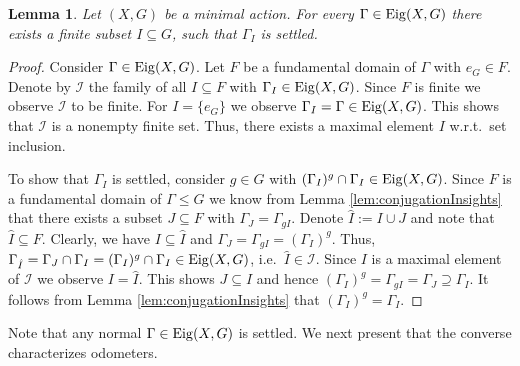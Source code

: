 \documentclass[12pt, reqno]{amsart}
\newtheorem{lemma}[theorem]{Lemma}
\theoremstyle{definition}
\theoremstyle{remark}
\numberwithin{equation}{section}
\theoremstyle{theorem}
\theoremstyle{remark}
\def\Eig{{\rm Eig}}
\begin{document}
\begin{lemma}
\label{lem:creatingEsettledSets}
    Let $(X,G)$ be a minimal action. 
    For every $\Gamma\in \Eig(X,G)$ 
    there exists a finite subset $I\subseteq G$, such that $\Gamma_I$ is settled. 
\end{lemma}
\begin{proof}
    Consider $\Gamma\in \Eig(X,G)$. 
    Let $F$ be a fundamental domain of $\Gamma$ with $e_G\in F$. 
    Denote by $\mathcal{I}$ the family of all $I\subseteq F$ with $\Gamma_I\in \Eig(X,G)$. 
    Since $F$ is finite we observe $\mathcal{I}$ to be finite. 
    For $I=\{e_G\}$ we observe $\Gamma_{I}=\Gamma\in \Eig(X,G)$. 
    This shows that $\mathcal{I}$ is a nonempty finite set. 
    Thus, there exists a maximal element $I$ w.r.t.\ set inclusion. 

    To show that $\Gamma_I$ is settled, consider $g\in G$ with 
    $(\Gamma_I)^g\cap \Gamma_I\in \Eig(X,G)$. 
    Since $F$ is a fundamental domain of $\Gamma\leq G$ we know from Lemma \ref{lem:conjugationInsights} that there exists a subset $J\subseteq F$ with $\Gamma_{J}=\Gamma_{gI}$. 
    Denote $\hat{I}:=I\cup J$ and note that $\hat{I}\subseteq F$. 
    Clearly, we have
    $I\subseteq \hat{I}$ and $\Gamma_J
    =\Gamma_{gI}
    =(\Gamma_I)^g.$
    Thus, 
    $\Gamma_{\hat{I}}=\Gamma_{J}\cap \Gamma_{I}=(\Gamma_{I})^g\cap \Gamma_{I}\in \Eig(X,G)$, i.e.\ $\hat{I}\in \mathcal{I}$.    
    Since $I$ is a maximal element of $\mathcal{I}$ we observe $I=\hat{I}$. 
    This shows $J\subseteq I$ and hence
    $(\Gamma_{I})^g=\Gamma_{gI}=\Gamma_{J}\supseteq \Gamma_{I}$. 
    It follows from Lemma \ref{lem:conjugationInsights} that $(\Gamma_{I})^g=\Gamma_{I}$.  
\end{proof}

Note that any normal $\Gamma\in \Eig(X,G)$ is settled.
We next present that the converse characterizes odometers. 
\end{document}
